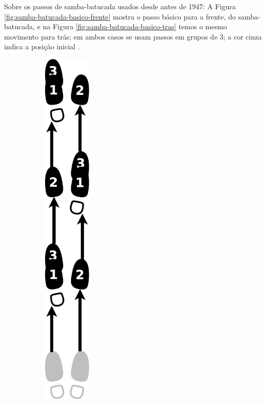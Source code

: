 \begin{itemize}
Sobre os passos de samba-batucada usados desde antes de 1947: 
A Figura \ref{fig:samba-batucada-basico-frente}  mostra o passo básico para a 
frente, do samba-batucada, 
e na  Figura \ref{fig:samba-batucada-basico-tras} temos o mesmo movimento para trás;
em ambos casos se usam passos em grupos de 3; a cor cinza indica a posição inicial \cite[pp. 61-62]{fornaciari1947aprender} \cite[pp. 63]{freitas1959danca}. 
\begin{figure}[h]
    \centering
    \begin{subfigure}[b]{0.4\textwidth}
        \centering
        \includegraphics[width=0.25\textwidth]{chapters/cap-historia-sambagafieira/samba-batucada-basico-frente.eps}

\end{subfigure}
\end{figure}
\end{itemize}
